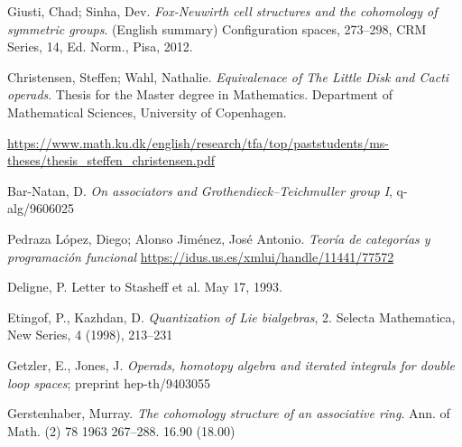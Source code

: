 \documentclass[TFM.tex]{subfiles}
\begin{document}
%








\begin{thebibliography}{}



 Giusti, Chad; Sinha, Dev.
\emph{Fox-Neuwirth cell structures and the cohomology of symmetric groups}. (English summary) Configuration spaces, 273–298, 
CRM Series, 14, Ed. Norm., Pisa, 2012.


 Christensen, Steffen; Wahl, Nathalie. \emph{Equivalenace of The Little Disk and
Cacti operads}. Thesis for the Master degree in Mathematics. Department of Mathematical Sciences, University of Copenhagen. %

 \url{https://www.math.ku.dk/english/research/tfa/top/paststudents/ms-theses/thesis_steffen_christensen.pdf}


 Bar-Natan, D. \emph{On associators and Grothendieck–Teichmuller group I}, q-alg/9606025

 Pedraza López, Diego; Alonso Jiménez, José Antonio. \emph{Teoría de categorías y programación funcional} \url{https://idus.us.es/xmlui/handle/11441/77572}

 Deligne, P. Letter to Stasheff et al. May 17, 1993.


  Etingof, P., Kazhdan, D. \emph{Quantization of Lie bialgebras}, 2. Selecta Mathematica, New
Series, 4 (1998), 213–231




 Getzler, E., Jones, J. \emph{Operads, homotopy algebra and iterated integrals for double loop
spaces}; preprint hep-th/9403055


 Gerstenhaber, Murray. \emph{The cohomology structure of an associative ring}. 
Ann. of Math. (2) 78 1963 267–288. 
16.90 (18.00)  %




\end{thebibliography}
\end{document}
